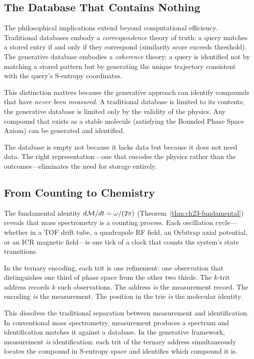 \subsection{The Database That Contains Nothing}
\label{sec:ch23-nothing}

The philosophical implications extend beyond computational efficiency.
Traditional databases embody a \emph{correspondence} theory of truth: a query
matches a stored entry if and only if they correspond (similarity score exceeds
threshold).  The generative database embodies a \emph{coherence} theory: a
query is identified not by matching a stored pattern but by generating the
unique trajectory consistent with the query's S-entropy coordinates.

This distinction matters because the generative approach can identify compounds
that have \emph{never been measured}.  A traditional database is limited to its
contents; the generative database is limited only by the validity of the physics.
Any compound that exists as a stable molecule (satisfying the Bounded Phase
Space Axiom) can be generated and identified.

The database is empty not because it lacks data but because it does not need
data.  The right representation---one that encodes the physics rather than the
outcomes---eliminates the need for storage entirely.

\subsection{From Counting to Chemistry}
\label{sec:ch23-counting}

The fundamental identity $d\mathcal{M}/dt = \omega/(2\pi)$
(Theorem~\ref{thm:ch23-fundamental}) reveals that mass spectrometry is a
counting process.  Each oscillation cycle---whether in a TOF drift tube, a
quadrupole RF field, an Orbitrap axial potential, or an ICR magnetic
field---is one tick of a clock that counts the system's state transitions.

In the ternary encoding, each trit is one refinement: one observation that
distinguishes one third of phase space from the other two thirds.  The
$k$-trit address records $k$ such observations.  The address \emph{is} the
measurement record.  The encoding \emph{is} the measurement.  The position
in the trie \emph{is} the molecular identity.

This dissolves the traditional separation between measurement and
identification.  In conventional mass spectrometry, measurement produces a
spectrum and identification matches it against a database.  In the generative
framework, measurement \emph{is} identification: each trit of the ternary
address simultaneously locates the compound in S-entropy space and identifies
which compound it is.

